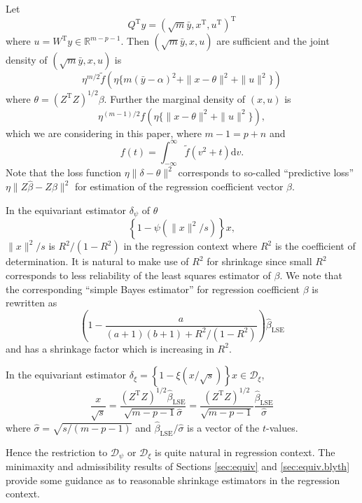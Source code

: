 \documentclass[preprint,11pt]{imsart}
\numberwithin{equation}{section}
\theoremstyle{plain}
\theoremstyle{definition}
\theoremstyle{remark}
\def\T{{ \mathrm{\scriptscriptstyle T} }}
\newcommand{\rd}{\mathrm{d}}
\begin{document}
Let
\begin{equation*}
 Q^\T y=(\sqrt{m}\bar{y}, x^\T, u^\T)^\T
\end{equation*}
where $u=W^\T y\in\mathbb{R}^{m-p-1}$.
Then $ (\sqrt{m}\bar{y}, x, u) $ are sufficient and
the joint density of $ (\sqrt{m}\bar{y}, x, u) $ 
is
\begin{equation*}
 \eta^{m/2}\tilde{f}(\eta\{m(\bar{y}-\alpha)^2+\|x-\theta\|^2+\|u\|^2\})
\end{equation*}
where $\theta=(Z^\T Z)^{1/2}\beta$.
Further the marginal density of $ (x, u) $ is
\begin{equation*}
 \eta^{(m-1)/2}f(\eta\{\|x-\theta\|^2+\|u\|^2\}),
\end{equation*}
which we are considering in this paper, where $m-1=p+n$ and 
\begin{equation*}
 f(t)=\int_{-\infty}^\infty \tilde{f}(v^2+t)\rd v.
\end{equation*}
Note that the loss function $\eta\|\delta-\theta\|^2$ corresponds to
so-called ``predictive loss'' $\eta\|Z\hat{\beta}-Z\beta\|^2$ for estimation of
the regression coefficient vector $\beta$.

In the equivariant estimator $\delta_\psi$ of $\theta$
\begin{equation*}
 \left\{1-\psi(\|x\|^2/s)\right\}x,
\end{equation*}
$\|x\|^2/s$ is $R^2/(1-R^2)$ in the regression context where $R^2$ is the coefficient of
determination. 
It is natural to make use of $R^2$ for shrinkage since small $R^2$
corresponds to less reliability of the least squares estimator of $\beta$.
We note that the corresponding ``simple Bayes estimator'' for regression coefficient $\beta$
 is rewritten as
\begin{equation*}
 \left(1-\frac{a}{(a+1)(b+1)+R^2/(1-R^2)}\right)\hat{\beta}_{\mathrm{LSE}}
\end{equation*}
and has a shrinkage factor which is increasing in $R^2$.

In the equivariant estimator $\delta_\xi=\left\{1-\xi(x/\sqrt{s})\right\}x\in \mathcal{D}_\xi$,
\begin{equation}
 \frac{x}{\sqrt{s}}=\frac{(Z^\T Z)^{1/2}\hat{\beta}_{\mathrm{LSE}}}{\sqrt{m-p-1}\hat{\sigma}}
  =\frac{(Z^\T Z)^{1/2}}{\sqrt{m-p-1}}\frac{\hat{\beta}_{\mathrm{LSE}}}{\hat{\sigma}}
\end{equation}
where $\hat{\sigma}=\sqrt{s/(m-p-1)}$ and $ \hat{\beta}_{\mathrm{LSE}}/\hat{\sigma}$ is
a vector of the $t$-values.

Hence the restriction to $\mathcal{D}_\psi $ or $\mathcal{D}_\xi$
is quite natural in regression context. 
The minimaxity and admissibility results of Sections \ref{sec:equiv} and \ref{sec:equiv.blyth} provide some
guidance as to reasonable shrinkage estimators in the regression context.
\end{document}
